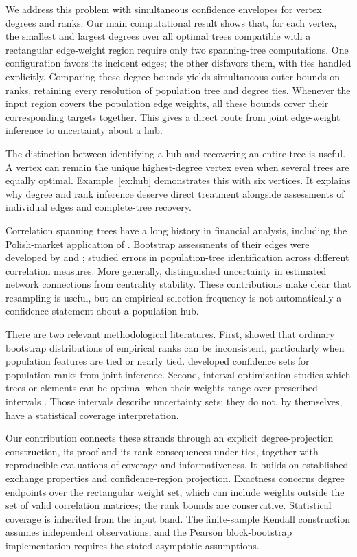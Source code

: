 \documentclass[pdflatex,sn-mathphys-ay]{sn-jnl}
\theoremstyle{thmstyleone}
\theoremstyle{thmstyletwo}
\begin{document}
We address this problem with simultaneous confidence envelopes for vertex degrees and ranks. Our main computational result shows that, for each vertex, the smallest and largest degrees over all optimal trees compatible with a rectangular edge-weight region require only two spanning-tree computations. One configuration favors its incident edges; the other disfavors them, with ties handled explicitly. Comparing these degree bounds yields simultaneous outer bounds on ranks, retaining every resolution of population tree and degree ties. Whenever the input region covers the population edge weights, all these bounds cover their corresponding targets together. This gives a direct route from joint edge-weight inference to uncertainty about a hub.

The distinction between identifying a hub and recovering an entire tree is useful. A vertex can remain the unique highest-degree vertex even when several trees are equally optimal. Example~\ref{ex:hub} demonstrates this with six vertices. It explains why degree and rank inference deserve direct treatment alongside assessments of individual edges and complete-tree recovery.

Correlation spanning trees have a long history in financial analysis, including the Polish-market application of \citet{galazka2011}. Bootstrap assessments of their edges were developed by \citet{tumminello2007} and \citet{musciotto2018}; \citet{kalyagin2022} studied errors in population-tree identification across different correlation measures. More generally, \citet{epskamp2018} distinguished uncertainty in estimated network connections from centrality stability. These contributions make clear that resampling is useful, but an empirical selection frequency is not automatically a confidence statement about a population hub.

There are two relevant methodological literatures. First, \citet{hall2009} showed that ordinary bootstrap distributions of empirical ranks can be inconsistent, particularly when population features are tied or nearly tied. \citet{mogstad2024} developed confidence sets for population ranks from joint inference. Second, interval optimization studies which trees or elements can be optimal when their weights range over prescribed intervals \citep{yaman2001,kasperski2007}. Those intervals describe uncertainty sets; they do not, by themselves, have a statistical coverage interpretation.

Our contribution connects these strands through an explicit degree-projection construction, its proof and its rank consequences under ties, together with reproducible evaluations of coverage and informativeness. It builds on established exchange properties and confidence-region projection. Exactness concerns degree endpoints over the rectangular weight set, which can include weights outside the set of valid correlation matrices; the rank bounds are conservative. Statistical coverage is inherited from the input band. The finite-sample Kendall construction assumes independent observations, and the Pearson block-bootstrap implementation requires the stated asymptotic assumptions.
\end{document}
